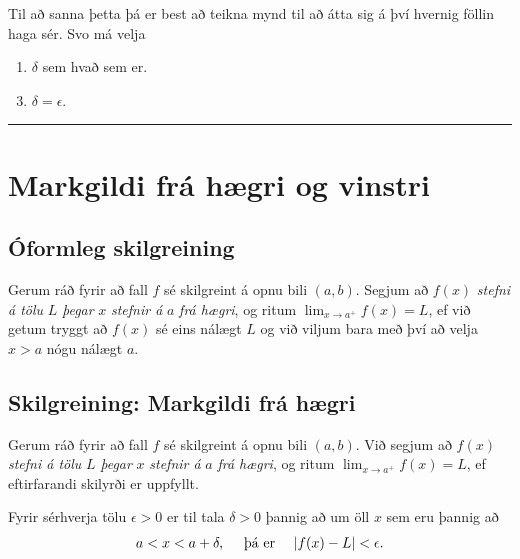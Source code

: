 \documentclass[b5paper,10pt,icelandic]{sphinxmanual}
\begin{document}
Til að sanna þetta þá er best að teikna mynd til að átta sig á því hvernig
föllin haga sér. Svo má velja
\begin{enumerate}
\item {} 
\(\delta\) sem hvað sem er.

\end{enumerate}
\begin{enumerate}
\setcounter{enumi}{2}
\item {} 
\(\delta=\epsilon\).

\end{enumerate}


\bigskip\hrule{}\bigskip



\section{Markgildi frá hægri og vinstri}
\label{kafli02:markgildi-fra-haegri-og-vinstri}

\subsection{Óformleg skilgreining}
\label{kafli02:index-1}\label{kafli02:oformleg-skilgreining}
Gerum ráð fyrir að fall \(f\) sé skilgreint á opnu bili
\((a,b)\). Segjum að \(f(x)\) \emph{stefni á tölu} \(L\) \emph{þegar}
\(x\) \emph{stefnir á} \(a\) \emph{frá hægri}, og ritum
\(\lim_{x\rightarrow a^+} f(x)=L\), ef við getum tryggt að
\(f(x)\) sé eins nálægt \(L\) og við viljum bara með því að
velja \(x>a\) nógu nálægt \(a\).


\subsection{Skilgreining: Markgildi frá hægri}
\label{kafli02:skilgreining-markgildi-fra-haegri}
Gerum ráð fyrir að fall \(f\) sé skilgreint á opnu bili
\((a,b)\). Við segjum að \(f(x)\) \emph{stefni á tölu} \(L\)
\emph{þegar} \(x\) \emph{stefnir á} \(a\) \emph{frá hægri}, og ritum
\(\lim_{x\rightarrow a^+} f(x)=L\), ef eftirfarandi skilyrði er
uppfyllt.

Fyrir sérhverja tölu \(\epsilon>0\) er til tala \(\delta>0\)
þannig að um öll \(x\) sem eru þannig að
\begin{gather}
\begin{split}a<x<a+\delta,\quad \text{ þá er } \quad |f(x)-L| <\epsilon.\end{split}\notag
\end{gather}
\end{document}
